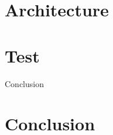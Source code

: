 \documentclass[8pt]{beamer}
\begin{document}
\section{Architecture}



\section{Test}
\begin{frame}
\end{frame}


\begin{frame}{Conclusion}
\section*{Conclusion}
\end{frame}
\end{document}
